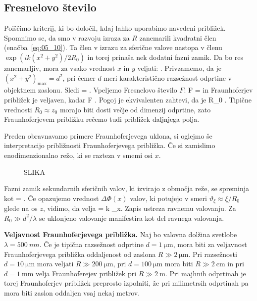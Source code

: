 \subsection*{Fresnelovo število}
Poiščimo kriterij, ki bo določil, kdaj lahko uporabimo navedeni približek. Spomnimo se, da smo
v razvoju izraza za $R$ zanemarili kvadratni člen (enačba~\ref{eq:05_10}). Ta člen v izrazu
za sferične valove nastopa v členu $\exp(ik(x^2 + y^2)/2R_0)$ in torej prinaša nek dodatni fazni 
zamik. Da bo res zanemarljiv, mora za vsako vrednost $x$ in $y$ veljati:
\beq
{}  \pi.
\label{eq:05_15}
\eeq
Privzamemo, da je $(x^2+y^2)_\mathrm{max} = d^2$, pri čemer $d$ meri karakteristično razsežnost 
odprtine v objektnem zaslonu. Sledi
\beq
{}  = \frac{2\pi}{\lambda} \pi.
\label{eq:05_16}
\eeq
Vpeljemo Fresnelovo število $F$:
\beq
F  = 
\label{eq:05_17}
\eeq
in Fraunhoferjev približek je veljaven, kadar
\beq
F . 
\label{eq:05_18}
\eeq
Pogoj je ekvivalenten zahtevi, da je 
\beq
R_0 \gg {}.
\label{eq:05_19}
\eeq
Tipične vrednosti $R_0 \approx z_0$  morajo biti dosti večje od dimenzij odprtine, zato 
Fraunhoferjevem približku rečemo tudi približek daljnjega polja. 
 
Preden obravnavamo primere Fraunhoferjevega uklona, si oglejmo še interpretacijo 
približnosti Fraunhoferjevega približka. Če si zamislimo enodimenzionalno režo, 
ki se razteza v smemi osi $x$. 
\begin{figure}[ht]
\centering
\def\svgwidth{120truemm} 
%
\caption{SLIKA}
\label{fig:05_priblizek}
\end{figure}

Fazni zamik sekundarnih sferičnih valov, ki izvirajo z območja reže, se spreminja kot
\beq
\Delta \Phi = .
\label{eq:05_20}
\eeq
Če opazujemo vrednost $\Delta \Phi(x)$ valov, ki potujejo v smeri $\vartheta_\xi \approx
\xi/R_0$ glede na os $z$, vidimo, da velja 
\beq
\Delta \Phi = k \varphi_\xi x.
\label{eq:05_21}
\eeq
Zapis ustreza ravnemu valovanju. Za $R_0 \gg d^2/\lambda$ se uklonjeno valovanje manifestira
kot del ravnega valovanja. 

\begin{example}{\bf Veljavnost Fraunhoferjevega približka.}
Naj bo valovna dolžina svetlobe $\lambda = 500~\si{nm}$. Če je tipična 
razsežnost odprtine $d = 1~\si{\micro\metre}$, mora biti za veljavnost 
Fraunhoferjevega približka oddaljenost od zaslona 
$R\gg 2~\si{\micro\metre}$. Pri razsežnosti
$d = 10~\si{\micro\metre}$ mora veljati $R\gg 200~\si{\micro\metre}$, 
pri $d = 100~\si{\micro\metre}$ mora biti $R\gg 2~\si{\centi\metre}$ in 
pri $d = 1~\si{\milli\metre}$ velja Fraunhoferejev približek pri 
$R\gg 2~\si{\metre}$. Pri majhnih odprtinah je torej Fraunhoferjev približek
preprosto izpolniti, že pri milimetrsih odprtinah
pa mora biti zaslon oddaljen vsaj nekaj metrov. 
\end{example}

